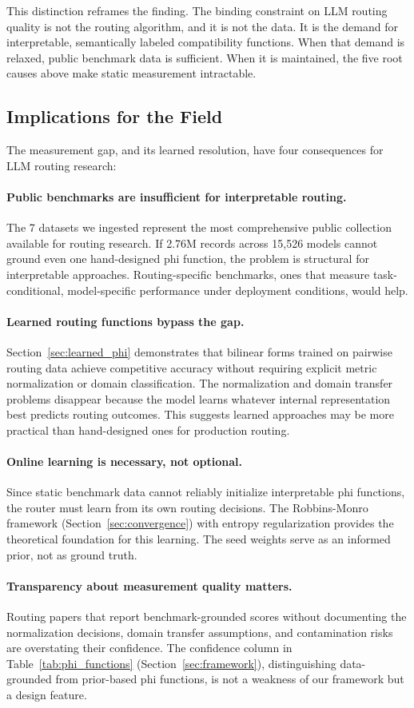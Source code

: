 This distinction reframes the finding. The binding constraint on LLM routing quality is not the routing algorithm, and it is not the data. It is the demand for interpretable, semantically labeled compatibility functions. When that demand is relaxed, public benchmark data is sufficient. When it is maintained, the five root causes above make static measurement intractable.

\subsection{Implications for the Field}

The measurement gap, and its learned resolution, have four consequences for LLM routing research:

\paragraph{Public benchmarks are insufficient for interpretable routing.} The 7 datasets we ingested represent the most comprehensive public collection available for routing research. If 2.76M records across 15,526 models cannot ground even one hand-designed phi function, the problem is structural for interpretable approaches. Routing-specific benchmarks, ones that measure task-conditional, model-specific performance under deployment conditions, would help.

\paragraph{Learned routing functions bypass the gap.} Section~\ref{sec:learned_phi} demonstrates that bilinear forms trained on pairwise routing data achieve competitive accuracy without requiring explicit metric normalization or domain classification. The normalization and domain transfer problems disappear because the model learns whatever internal representation best predicts routing outcomes. This suggests learned approaches may be more practical than hand-designed ones for production routing.

\paragraph{Online learning is necessary, not optional.} Since static benchmark data cannot reliably initialize interpretable phi functions, the router must learn from its own routing decisions. The Robbins-Monro framework (Section~\ref{sec:convergence}) with entropy regularization provides the theoretical foundation for this learning. The seed weights serve as an informed prior, not as ground truth.

\paragraph{Transparency about measurement quality matters.} Routing papers that report benchmark-grounded scores without documenting the normalization decisions, domain transfer assumptions, and contamination risks are overstating their confidence. The confidence column in Table~\ref{tab:phi_functions} (Section~\ref{sec:framework}), distinguishing data-grounded from prior-based phi functions, is not a weakness of our framework but a design feature.

